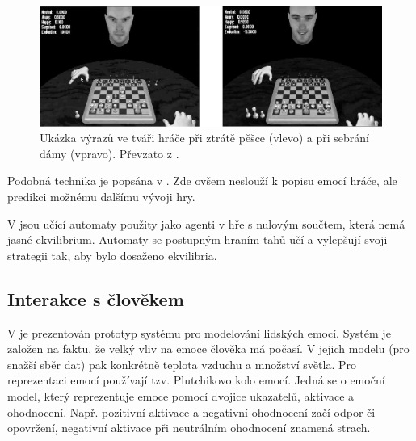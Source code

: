 \documentclass[a4paper,10pt]{article}
\begin{document}
\begin{figure}
 \centering
 \includegraphics[width=\textwidth]{chess-emos-screens}
 
 \caption{Ukázka výrazů ve tváři hráče při ztrátě pěšce (vlevo) a při sebrání dámy (vpravo). Převzato z \cite{AlvJoaCru-FuStMaAppEmoModEleGamCha}.} \label{img:ChessEmosScreens}
\end{figure}


Podobná technika je popsána v \cite{Hua+-LeaProbAutModChe}. Zde ovšem neslouží k popisu emocí hráče, ale predikci možnému dalšímu vývoji hry.


V \cite{FuLi-ForLeaAutAutGam} jsou učící automaty použity jako agenti v hře s nulovým součtem, která nemá jasné ekvilibrium. Automaty se postupným hraním tahů učí a vylepšují svoji strategii tak, aby bylo dosaženo ekvilibria.


\subsection{Interakce s člověkem}
V \cite{HeiTri-SimEmoPerHumComInt} je prezentován prototyp systému pro modelování lidských emocí. Systém je založen na faktu, že velký vliv na emoce člověka má počasí. V jejich modelu (pro snažší sběr dat) pak konkrétně teplota vzduchu a množství světla. Pro reprezentaci emocí používají tzv. Plutchikovo kolo emocí. Jedná se o emoční model, který reprezentuje emoce pomocí dvojice ukazatelů, aktivace a ohodnocení. Např. pozitivní aktivace a negativní ohodnocení začí odpor či opovržení, negativní aktivace při neutrálním ohodnocení znamená strach.
\end{document}
